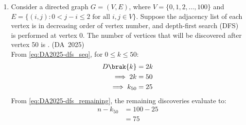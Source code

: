 \begin{enumerate}[label=\thesubsection.\arabic*, ref=\thesubsection.\theenumi]
\begin{itemize}
	\item Popping Phase ($\text{flag} = 1$):
	Because braces $\{\}$ are not used after \texttt{if (x is odd):}, standard pseudocode scoping rules apply the condition solely to the single next statement \texttt{Pop(S)}. The statement \texttt{Set sum = sum + x} belongs to the outer \texttt{if (flag equals 1)} block and executes on every pop iteration:
	\begin{enumerate}
		\item Pop $x = 8$ (even): no extra pop occurs $\implies \text{sum} = 0 + 8 = 8$.
		\item Pop $x = 7$ (odd): additionally pops $6 \implies \text{sum} = 8 + 7 = 15$.
		\item Pop $x = 5$ (odd): additionally pops $4 \implies \text{sum} = 15 + 5 = 20$.
		\item Pop $x = 3$ (odd): additionally pops $2 \implies \text{sum} = 20 + 3 = 23$.
		\item Pop $x = 1$ (odd): additionally pops $0 \implies \text{sum} = 23 + 1 = 24$.
	\end{enumerate}
\end{itemize}
The stack is now empty, terminating the loop.
\begin{align}
	\text{sum} = 24
\end{align}
The following code verifies the solution
\begin{lstlisting}[frame=single, basicstyle=\rmfamily, escapeinside={(*@}{@*)}]
(*@\makebox[\dimexpr\linewidth-2\fboxsep-2\fboxrule\relax][c]{codes/q45/q45.py}@*)
\end{lstlisting}
	\item 
	Consider a directed graph $G = (V, E)$, where $V = \{0, 1, 2, \dots, 100\}$ and $E = \{(i, j) : 0 < j - i \le 2 \text{ for all } i, j \in V\}$. Suppose the adjacency list of each vertex is in decreasing order of vertex number, and depth-first search (DFS) is performed at vertex 0. The number of vertices that will be discovered after vertex 50 is \underline{\hspace{1.5cm}}.
	\hfill (DA~2025)
	\\
	\solution
	From \eqref{eq:DA2025-dfs_seq}, for $0 \le k \le 50$:
	\begin{align}
		D\brak{k} &= 2k
		\\
		\implies 2k &= 50
		\\
		\implies k_{50} &= 25
	\end{align}
	From \eqref{eq:DA2025-dfs_remaining}, the remaining discoveries evaluate to:
	\begin{align}
		n - k_{50} &= 100 - 25
		\\
		&= 75
	\end{align}
	
\end{enumerate}